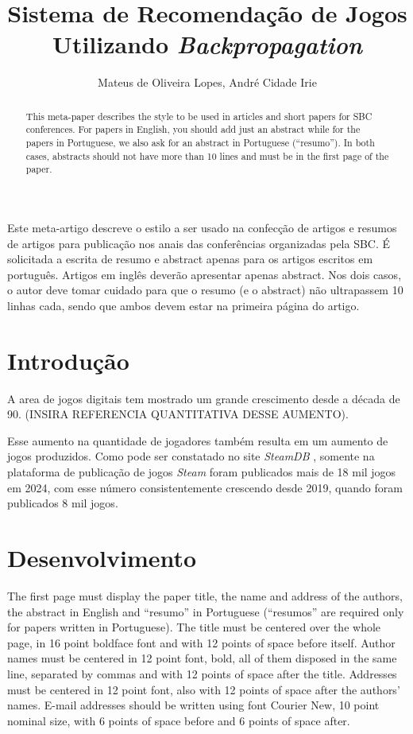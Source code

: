 \documentclass[12pt]{article}
\title{Sistema de Recomendação de Jogos Utilizando \textit{Backpropagation}}
\author{Mateus de Oliveira Lopes\inst{1}, André Cidade Irie\inst{1}}
\begin{document}
 

\maketitle

\begin{abstract}
  This meta-paper describes the style to be used in articles and short papers
  for SBC conferences. For papers in English, you should add just an abstract
  while for the papers in Portuguese, we also ask for an abstract in
  Portuguese (``resumo''). In both cases, abstracts should not have more than
  10 lines and must be in the first page of the paper.
\end{abstract}
     
\begin{resumo} 
  Este meta-artigo descreve o estilo a ser usado na confecção de artigos e
  resumos de artigos para publicação nos anais das conferências organizadas
  pela SBC. É solicitada a escrita de resumo e abstract apenas para os artigos
  escritos em português. Artigos em inglês deverão apresentar apenas abstract.
  Nos dois casos, o autor deve tomar cuidado para que o resumo (e o abstract)
  não ultrapassem 10 linhas cada, sendo que ambos devem estar na primeira
  página do artigo.
\end{resumo}


\section{Introdução}

A area de jogos digitais tem mostrado um grande crescimento desde a 
década de 90. (INSIRA REFERENCIA QUANTITATIVA DESSE AUMENTO).

Esse aumento na quantidade de jogadores também resulta em um aumento de
jogos produzidos. Como pode ser constatado no site \textit{SteamDB} \cite{steamdb}, somente
na plataforma de publicação de jogos \textit{Steam} foram publicados mais de 
18 mil jogos em 2024, com esse número consistentemente crescendo desde 2019,
quando foram publicados 8 mil jogos.

\section{Desenvolvimento} \label{sec:firstpage}

The first page must display the paper title, the name and address of the
authors, the abstract in English and ``resumo'' in Portuguese (``resumos'' are
required only for papers written in Portuguese). The title must be centered
over the whole page, in 16 point boldface font and with 12 points of space
before itself. Author names must be centered in 12 point font, bold, all of
them disposed in the same line, separated by commas and with 12 points of
space after the title. Addresses must be centered in 12 point font, also with
12 points of space after the authors' names. E-mail addresses should be
written using font Courier New, 10 point nominal size, with 6 points of space
before and 6 points of space after.
\end{document}
